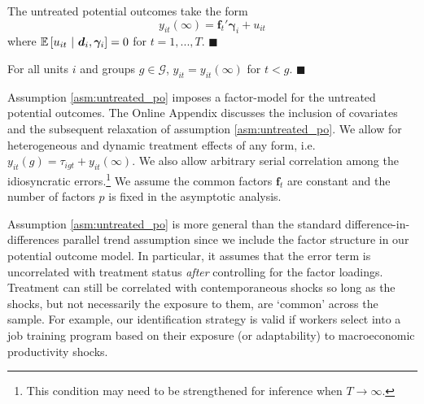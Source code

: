 \documentclass[12pt]{article}
\begin{document}
\begin{assumption}\label{asm:untreated_po}
The untreated potential outcomes take the form
\begin{equation*}
  y_{it}(\infty) = \bm f_t' \bm \gamma_i + u_{it}
\end{equation*}
where $\mathbb{E}\left[u_{it} \ \vert \ \bm d_i, \bm \gamma_i\right] = 0$ for $t = 1,...,T$. $\blacksquare$
\end{assumption}

\begin{assumption}\label{asm:no_anticipation}
For all units $i$ and groups $g \in \mathcal{G}$, $y_{it} = y_{it}(\infty)$ for $t < g$. $\blacksquare$ %
\end{assumption}

Assumption \ref{asm:untreated_po} imposes a factor-model for the untreated potential outcomes. The Online Appendix discusses the inclusion of covariates and the subsequent relaxation of assumption \ref{asm:untreated_po}. We allow for heterogeneous and dynamic treatment effects of any form, i.e. $y_{it}(g) = \tau_{igt} + y_{it}(\infty)$. We also allow arbitrary serial correlation among the idiosyncratic errors.\footnote{This condition may need to be strengthened for inference when $T \rightarrow \infty$.} We assume the common factors $\bm f_t$ are constant and the number of factors $p$ is fixed in the asymptotic analysis. 

Assumption \ref{asm:untreated_po} is more general than the standard difference-in-differences parallel trend assumption since we include the factor structure in our potential outcome model. In particular, it assumes that the error term is uncorrelated with treatment status \emph{after} controlling for the factor loadings. Treatment can still be correlated with contemporaneous shocks so long as the shocks, but not necessarily the exposure to them, are `common' across the sample. For example, our identification strategy is valid if workers select into a job training program based on their exposure (or adaptability) to macroeconomic productivity shocks. 
\end{document}
